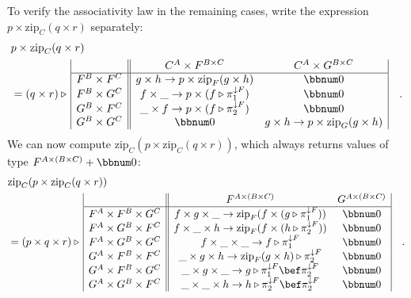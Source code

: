 To verify the associativity law in the remaining cases, write the
expression $p\times\text{zip}_{C}(q\times r)$ separately:
\begin{align*}
 & p\times\text{zip}_{C}(q\times r)\\
 & =(q\times r)\triangleright\,\begin{array}{|c||cc|}
 & C^{A}\times F^{B\times C} & C^{A}\times G^{B\times C}\\
\hline F^{B}\times F^{C} & g\times h\rightarrow p\times\text{zip}_{F}(g\times h) & \bbnum 0\\
F^{B}\times G^{C} & f\times\_\rightarrow p\times(f\triangleright\pi_{1}^{\downarrow F}) & \bbnum 0\\
G^{B}\times F^{C} & \_\times f\rightarrow p\times(f\triangleright\pi_{2}^{\downarrow F}) & \bbnum 0\\
G^{B}\times G^{C} & \bbnum 0 & g\times h\rightarrow p\times\text{zip}_{G}(g\times h)
\end{array}\quad.
\end{align*}
We can now compute $\text{zip}_{C}(p\times\text{zip}_{C}(q\times r))$,
which always returns values of type $F^{A\times(B\times C)}+\bbnum 0$:\\
\begin{align*}
 & \text{zip}_{C}(p\times\text{zip}_{C}(q\times r))\\
 & =(p\times q\times r)\triangleright\,\begin{array}{|c||cc|}
 & F^{A\times(B\times C)} & G^{A\times(B\times C)}\\
\hline F^{A}\times F^{B}\times G^{C} & f\times g\times\_\rightarrow\text{zip}_{F}(f\times(g\triangleright\pi_{1}^{\downarrow F})) & \bbnum 0\\
F^{A}\times G^{B}\times F^{C} & f\times\_\times h\rightarrow\text{zip}_{F}(f\times(h\triangleright\pi_{2}^{\downarrow F})) & \bbnum 0\\
F^{A}\times G^{B}\times G^{C} & f\times\_\times\_\rightarrow f\triangleright\pi_{1}^{\downarrow F} & \bbnum 0\\
G^{A}\times F^{B}\times F^{C} & \_\times g\times h\rightarrow\text{zip}_{F}(g\times h)\triangleright\pi_{2}^{\downarrow F} & \bbnum 0\\
G^{A}\times F^{B}\times G^{C} & \_\times g\times\_\rightarrow g\triangleright\pi_{1}^{\downarrow F}\bef\pi_{2}^{\downarrow F} & \bbnum 0\\
G^{A}\times G^{B}\times F^{C} & \_\times\_\times h\rightarrow h\triangleright\pi_{2}^{\downarrow F}\bef\pi_{2}^{\downarrow F} & \bbnum 0
\end{array}\quad.
\end{align*}
